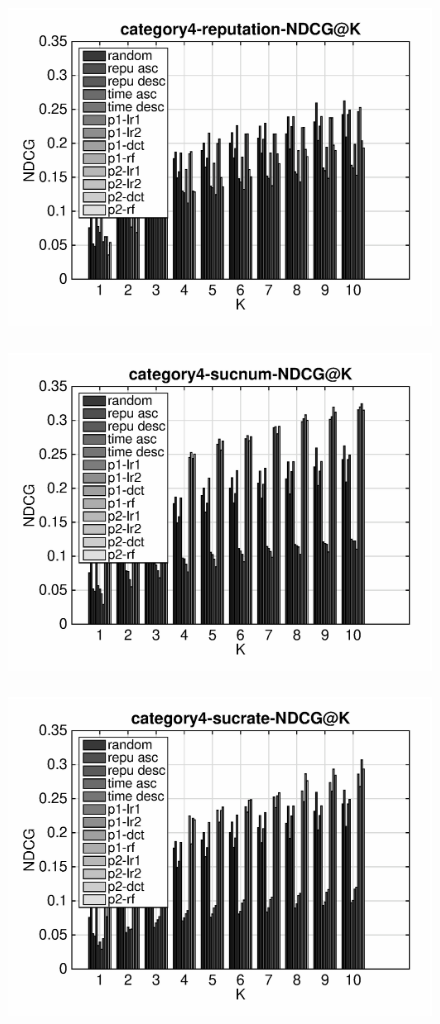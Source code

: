 \documentclass{article}
\begin{document}
\begin{figure}[ht]
\begin{flushleft}
\includegraphics[width=18cm,height=9cm]{category4-reputation-NDCG@K.eps}
\includegraphics[width=18cm,height=9cm]{category4-sucnum-NDCG@K.eps}
\includegraphics[width=18cm,height=9cm]{category4-sucrate-NDCG@K.eps}
\end{flushleft}
\end{figure}
\end{document}

